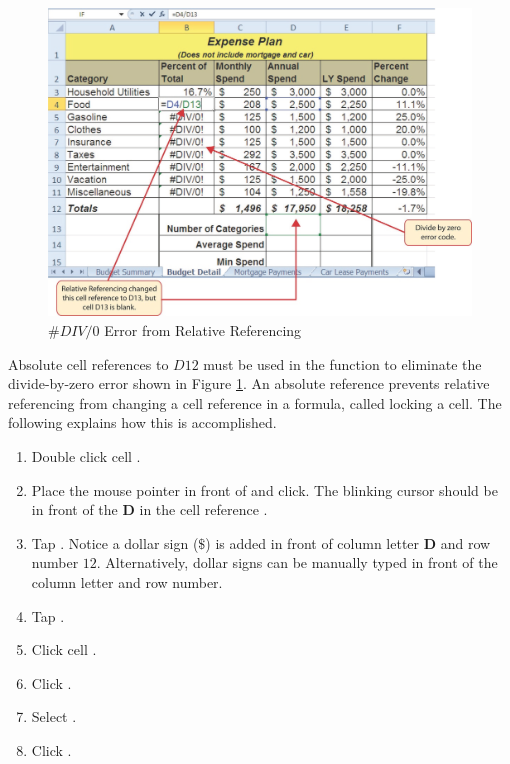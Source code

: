 \begin{figure}[H]
	\centering
	\includegraphics[width=\maxwidth{.95\linewidth}]{gfx/ch02_fig15}
	\caption{$ \#DIV/0 $ Error from Relative Referencing}
	\label{02:fig15}
\end{figure}

Absolute cell references to $ D12 $ must be used in the function to eliminate the divide-by-zero error shown in Figure \ref{02:fig15}. An absolute reference prevents relative referencing from changing a cell reference in a formula, called locking a cell. The following explains how this is accomplished.

\begin{enumbox}
	\begin{enumerate}
		\item Double click cell .
		\item Place the mouse pointer in front of  and click. The blinking cursor should be in front of the \textbf{D} in the cell reference .
		\item Tap . Notice a dollar sign ($ \$ $) is added in front of column letter \textbf{D} and row number \textbf{$ 12 $}. Alternatively, dollar signs can be manually typed in front of the column letter and row number.
		\item Tap .
		\item Click cell .
		\item Click .
		\item Select .
		\item Click .
	\end{enumerate}
\end{enumbox}

